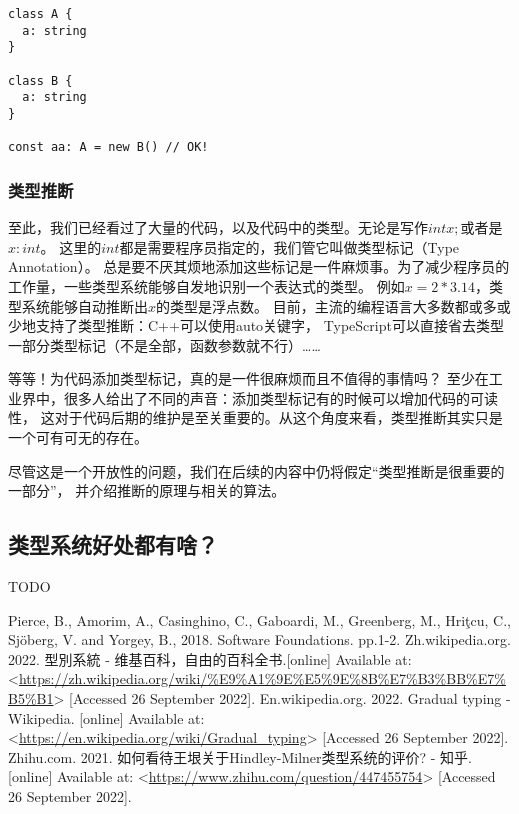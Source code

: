 \documentclass[../main.tex]{subfiles}
\begin{document}
\begin{lstlisting}
class A {
  a: string
}

class B {
  a: string
}

const aa: A = new B() // OK!
\end{lstlisting}

  \subsubsection*{类型推断}
  \indent 至此，我们已经看过了大量的代码，以及代码中的类型。无论是写作$int x;$或者是$x: int$。
  这里的$int$都是需要程序员指定的，我们管它叫做类型标记（Type Annotation）。
  总是要不厌其烦地添加这些标记是一件麻烦事。为了减少程序员的工作量，一些类型系统能够自发地识别一个表达式的类型。
  例如$x = 2 * 3.14$，类型系统能够自动推断出$x$的类型是浮点数。
  目前，主流的编程语言大多数都或多或少地支持了类型推断：C++可以使用auto关键字，
  TypeScript可以直接省去类型一部分类型标记（不是全部，函数参数就不行）……

  \indent 等等！为代码添加类型标记，真的是一件很麻烦而且不值得的事情吗？
  至少在工业界中，很多人给出了不同的声音：添加类型标记有的时候可以增加代码的可读性，
  这对于代码后期的维护是至关重要的。从这个角度来看，类型推断其实只是一个可有可无的存在。 \cite{zh}

  \indent 尽管这是一个开放性的问题，我们在后续的内容中仍将假定“类型推断是很重要的一部分”，
  并介绍推断的原理与相关的算法。

  \subsection{类型系统好处都有啥？}
  TODO

  \begin{thebibliography}{4}
     Pierce, B., Amorim, A., Casinghino, C., Gaboardi, M., Greenberg, M., Hriţcu, C., Sjöberg, V. and Yorgey, B., 2018. Software Foundations. pp.1-2.
     Zh.wikipedia.org. 2022. 型別系統 - 维基百科，自由的百科全书.[online] Available at: <\url{https://zh.wikipedia.org/wiki/%E9%A1%9E%E5%9E%8B%E7%B3%BB%E7%B5%B1}> [Accessed 26 September 2022].
     En.wikipedia.org. 2022. Gradual typing - Wikipedia. [online] Available at: <\url{https://en.wikipedia.org/wiki/Gradual_typing}> [Accessed 26 September 2022].
     Zhihu.com. 2021. 如何看待王垠关于Hindley-Milner类型系统的评价? - 知乎. [online] Available at: <\url{https://www.zhihu.com/question/447455754}> [Accessed 26 September 2022].
  \end{thebibliography}
\end{document}
